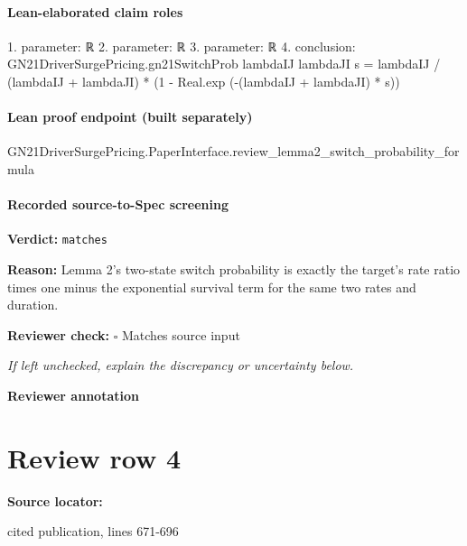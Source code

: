 \documentclass[10pt]{article}
\newcommand{\reviewerbox}{%
  \par\noindent\fbox{\parbox{0.96\linewidth}{\rule{0pt}{0.38in}}}\par
}
\newcommand{\reviewmatch}[1]{%
  \par\noindent\textbf{Reviewer check:} $\square$\; #1\par
  \noindent\emph{If left unchecked, explain the discrepancy or uncertainty below.}\par
}
\begin{document}
\paragraph{Lean-elaborated claim roles}\begin{ReviewVerbatim}
1. parameter: ℝ
2. parameter: ℝ
3. parameter: ℝ
4. conclusion: GN21DriverSurgePricing.gn21SwitchProb lambdaIJ lambdaJI s =
  lambdaIJ / (lambdaIJ + lambdaJI) * (1 - Real.exp (-(lambdaIJ + lambdaJI) * s))
\end{ReviewVerbatim}

\paragraph{Lean proof endpoint (built separately)}\begin{ReviewVerbatim}
GN21DriverSurgePricing.PaperInterface.review_lemma2_switch_probability_formula
\end{ReviewVerbatim}

\paragraph{Recorded source-to-Spec screening}
\textbf{Verdict:} \texttt{matches}
\\
{\raggedright
\textbf{Reason:} Lemma 2's two-\allowbreak{}state switch probability is exactly the target's rate ratio times one minus the exponential survival term for the same two rates and duration.\allowbreak{}
\par}
\reviewmatch{Matches source input}
\noindent\textbf{Reviewer annotation}\par
\reviewerbox
\clearpage
\hypertarget{source-claim-ebc105656e6d5688}{}
\section*{Review row 4}
\textbf{Source locator:} {\footnotesize\raggedright cited publication, lines 671-\allowbreak{}696\par}
\end{document}
